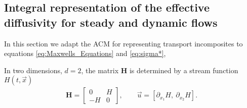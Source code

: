 \documentclass[11pt]{amsart}
\newcommand{\Hb}{\mathbf{H}}
\begin{document}
\subsection{Integral representation of the effective diffusivity for
  steady and dynamic flows}\label{sec:Integral_Rep}
%
In this section we adapt the ACM for representing transport
incomposites to equations \eqref{eq:Maxwells_Equations} and
\eqref{eq:sigma*},  




In two dimensions, $d=2$, the matrix $\Hb$ is determined by a stream
function $H(t,\vec{x})$ 
%
\begin{align}\label{eq:u_H}  
  \Hb=\left[
  \begin{array}{cc}
    0  & H\\
    -H & 0
  \end{array}
  \right],
  \qquad
  \vec{u}=[\partial_{x_1}H, \ \partial_{x_2}H].
\end{align}
%

\newpage
\end{document}
